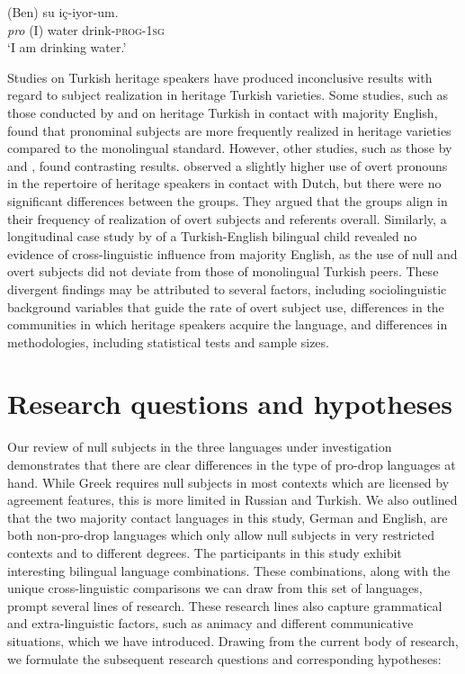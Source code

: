 \documentclass[output=paper,colorlinks,citecolor=brown]{langscibook}
\begin{document}
\ea \label{ex:oezsoy:Iamdrinkingwater}
\gll (Ben) su iç-iyor-um.\\ 
	{\textit{pro} (I)} water drink-\textsc{prog}-1\textsc{sg}\\
\glt `I am drinking water.'
\z
{}

Studies on Turkish heritage speakers have produced inconclusive results with regard to subject realization in heritage Turkish varieties. Some studies, such as those conducted by \textcite{Haznedar2010} and \textcite{Koc2016} on heritage Turkish in contact with majority English, found that pronominal subjects are more frequently realized in heritage varieties compared to the monolingual standard. However, other studies, such as those by \textcite{AzarEtAl2020} and \textcite{dikilitacsacquisition}, found contrasting results. 
\textcite{AzarEtAl2020} observed a slightly higher use of overt pronouns in the repertoire of heritage speakers in contact with Dutch, but there were no significant differences between the groups. They argued that the groups align in their frequency of realization of overt subjects and referents overall. Similarly, a longitudinal case study by \textcite{dikilitacsacquisition} of a Turkish-English bilingual child revealed no evidence of cross-linguistic influence from majority English, as the use of null and overt subjects did not deviate from those of monolingual Turkish peers. These divergent findings may be attributed to several factors, including sociolinguistic background variables that guide the rate of overt subject use, differences in the communities in which heritage speakers acquire the language, and differences in methodologies, including statistical tests and sample sizes.

\section{Research questions and hypotheses} \label{sec:oezsoy6RQs}
Our review of null subjects in the three languages under investigation demonstrates that there are clear differences in the type of pro-drop languages at hand. While Greek requires null subjects in most contexts which are licensed by agreement features, this is more limited in Russian and Turkish. We also outlined that the two majority contact languages in this study, German and English, are both non-pro-drop languages which only allow null subjects in very restricted contexts and to different degrees. The participants in this study exhibit interesting bilingual language combinations. These combinations, along with the unique cross-linguistic comparisons we can draw from this set of languages, prompt several lines of research. These research lines also capture grammatical and extra-linguistic factors, such as animacy and different communicative situations, which we have introduced. Drawing from the current body of research, we formulate the subsequent research questions and corresponding hypotheses:
\end{document}

